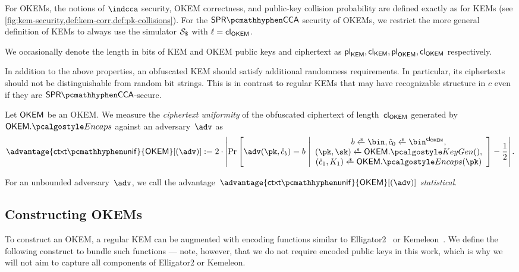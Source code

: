 For OKEMs, the notions of $\indcca$ security, OKEM correctness, and public-key collision probability are defined exactly as for KEMs (see \cref{fig:kem-security,def:kem-corr,def:pk-collisions}). For the $\sprcca$ security of OKEMs, we restrict the more general definition of KEMs to always use the simulator $\simulbin$ with $\ell = {\mathsf{cl}_{\mathsf{OKEM}}}$.

We occasionally denote the length in bits of KEM and OKEM public keys and ciphertext as ${\mathsf{pl}_{\mathsf{KEM}}}, {\mathsf{cl}_{\mathsf{KEM}}}, {\mathsf{pl}_{\mathsf{OKEM}}}, {\mathsf{cl}_{\mathsf{OKEM}}}$ respectively.

In addition to the above properties, an obfuscated KEM should satisfy additional randomness requirements. In particular, its ciphertexts should not be distinguishable from random bit strings. This is in contrast to regular KEMs that may have recognizable structure in $c$ even if they are $\sprcca$-secure.

\begin{definition}
\label{def:ctxt-uniformity}
    Let $\mathsf{OKEM}$ be an OKEM.
    We measure the \emph{ciphertext uniformity} of the obfuscated ciphertext of length~${\mathsf{cl}_{\mathsf{OKEM}}}$ generated by $\OKEM.\encaps$ against an adversary~$\adv$ as
    \[
        \advantage{\ctxtunif}{\OKEM}[(\adv)] := 
        2 \cdot \left|
        \Pr\left[
            \adv(\pk, \hat c_b) = b
        ~\middle|
            \begin{array}{c}
                b \getsr \bin, \hat c_0 \getsr \bin^{\obfctxtlen}, \\
                (\pk,\sk) \getsr \OKEM.\kgen(),\\
                (\hat c_1, K_1) \getsr \OKEM.\encaps(\pk)
            \end{array}
        \right]
        - \frac{1}{2}
        \right|.
    \]
    
    For an unbounded adversary~$\adv$, we call the advantage~$\advantage{\ctxtunif}{\OKEM}[(\adv)] $ \emph{statistical}.
\end{definition}

\subsection{Constructing OKEMs}

To construct an OKEM, a regular KEM can be augmented with encoding functions similar to \textsf{Elligator2}~\cite{CCS:BHKL13} or \textsf{Kemeleon}~\cite[Sec. 2.4]{CCS:GunSteVei24}. We define the following construct to bundle such functions --- note, however, that we do not require encoded public keys in this work, which is why we will not aim to capture all components of \textsf{Elligator2} or \textsf{Kemeleon}.

